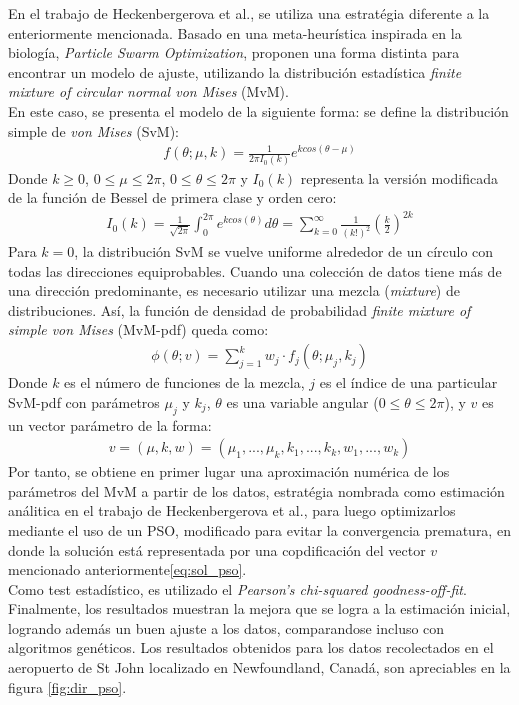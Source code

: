 En el trabajo de Heckenbergerova et al.\cite{Heckenbergerova15}, se utiliza una estratégia diferente a la enteriormente mencionada. Basado en una meta-heurística inspirada en la biología, \emph{Particle Swarm Optimization}, proponen una forma distinta para encontrar un modelo de ajuste, utilizando la distribución estadística \emph{finite mixture of circular normal von Mises} (MvM).\\ 
En este caso, se presenta el modelo de la siguiente forma: se define la distribución simple de \emph{von Mises} (SvM):
\begin{align}
    f(\theta; \mu, k) = \frac{1}{2{\pi}I_{0}(k)}e^{k cos(\theta - \mu)}
\end{align}    
Donde $k \geq 0$, $0 \leq \mu \leq 2\pi$, $0 \leq \theta \leq 2\pi$ y $I_0(k)$ representa la versión modificada de la función de Bessel de primera clase y orden cero:
\begin{align}
    I_0(k) = \frac{1}{\sqrt{2\pi}}\int_0^{2\pi} e^{k cos(\theta)} d\theta = \sum_{k=0}^{\infty} \frac{1}{(k!)^2}(\frac{k}{2})^{2k}
\end{align}    
Para $k=0$, la distribución SvM se vuelve uniforme alrededor de un círculo con todas las direcciones equiprobables. Cuando una colección de datos tiene más de una dirección predominante, es necesario utilizar una mezcla (\emph{mixture}) de distribuciones.
Así, la función de densidad de probabilidad \emph{finite mixture of simple von Mises} (MvM-pdf) queda como:
\begin{align}
    \phi(\theta; v) = \sum_{j=1}^{k} w_j \cdot f_j(\theta; \mu_j, k_j)
\end{align}    
Donde $k$ es el número de funciones de la mezcla, $j$ es el índice de una particular SvM-pdf con parámetros $\mu_j$ y $k_j$, $\theta$ es una variable angular ($0 \leq \theta \leq 2\pi$), y $v$ es un vector parámetro de la forma:
 \begin{align}\label{eq:sol_pso}
    v = (\mu, k, w) = (\mu_1, ..., \mu_k,k_1,...,k_k,w_1,...,w_k)
\end{align}
Por tanto, se obtiene en primer lugar una aproximación numérica de los parámetros del MvM a partir de los datos, estratégia nombrada como estimación análitica en el trabajo de Heckenbergerova et al., para luego optimizarlos mediante el uso de un PSO, modificado para evitar la convergencia prematura, en donde la solución está representada por una copdificación del vector $v$ mencionado anteriormente\ref{eq:sol_pso}.\\ 
Como test estadístico, es utilizado el \emph{Pearson's chi-squared goodness-off-fit}. Finalmente, los resultados muestran la mejora que se logra a la estimación inicial, logrando además un buen ajuste a los datos, comparandose incluso con algoritmos genéticos. Los resultados obtenidos para los datos recolectados en el aeropuerto de St John localizado en Newfoundland, Canadá, son apreciables en la figura \ref{fig:dir_pso}.
